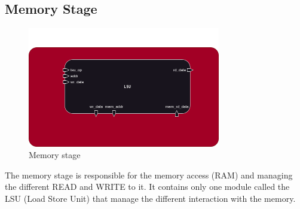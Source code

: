 \subsection{Memory Stage}

\begin{figure}[H]
    \centering
    \includegraphics[width=0.75\textwidth]{../diagrams/memory/mem_stage.png}
    \caption{Memory stage}
    \label{fig:mem_stage}
\end{figure}

The memory stage is responsible for the memory access (RAM) and managing the different READ and WRITE to it.
It contains only one module called the LSU (Load Store Unit) that manage the different interaction with the memory.


